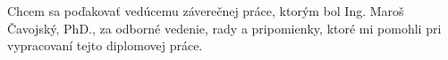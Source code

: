 Chcem sa poďakovať vedúcemu záverečnej práce, ktorým bol Ing. Maroš Čavojský, PhD., za
odborné vedenie, rady a pripomienky, ktoré mi pomohli pri vypracovaní tejto diplomovej
práce.